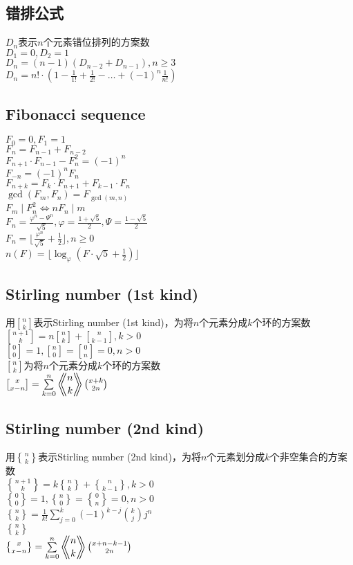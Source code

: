 	\subsection*{错排公式}
		$ D_n $表示$ n $个元素错位排列的方案数
		\\$ D_1 = 0, D_2 = 1 $
		\\$ D_n = (n - 1)(D_{n - 2} + D_{n - 1}), n \geq 3 $
		\\$ D_n = n! \cdot (1 - \frac{1}{1!} + \frac{1}{2!} - \dots + (-1)^n\frac{1}{n!}) $
	\subsection*{Fibonacci sequence}
		$ F_0 = 0, F_1 = 1 $
		\\$ F_n = F_{n - 1} + F_{n - 2} $
		\\$ F_{n + 1} \cdot F_{n - 1} - F_{n}^2 = (-1)^n $
		\\$ F_{-n} = (-1)^n F_n $
		\\$ F_{n + k} = F_k \cdot F_{n + 1} + F_{k - 1} \cdot F_n $
		\\$ \gcd(F_m, F_n) = F_{\gcd(m, n)} $
		\\$ F_m \mid F_n^2 \Leftrightarrow nF_n \mid m $
		\\$ F_n = \frac{\varphi^n - \varPsi^n}{\sqrt{5}}, \varphi = \frac{1 + \sqrt{5}}{2}, \varPsi = \frac{1 - \sqrt{5}}{2} $
		\\$ F_n = \lfloor \frac{\varphi^n}{\sqrt{5}} + \frac{1}{2} \rfloor, n \geq 0 $
		\\$ n(F) = \lfloor \log_\varphi(F \cdot \sqrt{5} + \frac{1}{2}) \rfloor $
	\subsection*{Stirling number (1st kind)}
		用$ {n \brack k} $表示Stirling number (1st kind)，为将$ n $个元素分成$ k $个环的方案数
		\\$ {n + 1 \brack k} = n {n \brack k} + {n \brack k - 1}, k > 0 $
		\\$ {0 \brack 0} = 1, {n \brack 0} = {0 \brack n} = 0, n > 0 $
		\\$ {n \brack k} $为将$ n $个元素分成$ k $个环的方案数
		\\$ {x \brack x - n} = \sum\limits_{k = 0}^{n} \Eularian{n}{k} \binom{x + k}{2 n} $
	\subsection*{Stirling number (2nd kind)}
		用$ {n \brace k} $表示Stirling number (2nd kind)，为将$ n $个元素划分成$ k $个非空集合的方案数
		\\$ {n + 1 \brace k} = k {n \brace k} + {n \brace k - 1}, k > 0 $
		\\$ {0 \brace 0} = 1, {n \brace 0} = {0 \brace n} = 0, n > 0 $
		\\$ {n \brace k} = \frac{1}{k!} \sum\limits_{j = 0}^{k} (-1) ^ {k - j} \binom{k}{j} j^n $
		\\$ {n \brace k} $
		\\$ {x \brace x - n} = \sum\limits_{k = 0}^{n} \Eularian{n}{k} \binom{x + n - k - 1}{2 n} $
